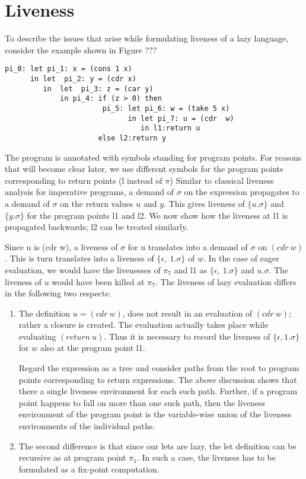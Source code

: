 \section{Liveness}\label{sec:liveness}
To describe the issues that arise while formulating liveness of a lazy
language, consider the example shown in Figure ???

\begin{verbatim}
pi_0: let pi_1: x = (cons 1 x)
      in let  pi_2: y = (cdr x)
         in  let  pi_3: z = (car y)
             in pi_4: if (z > 0) then 
                       pi_5: let pi_6: w = (take 5 x)
                             in let pi_7: u = (cdr  w)
                                in l1:return u
                      else l2:return y

\end{verbatim}

The program is annotated with symbols standing for program points. For
reasons that will  become clear later, we use  different symbols for
the program points corresponding to return points (l instead of $\pi$)
Similar  to classical  liveness  analysis for  imperative programs,  a
demand  of  $\sigma$ on  the  expression  propagates  to a  demand  of
$\sigma$  on the return  values $u$  and $y$.  This gives  liveness of
$\lbrace u.\sigma \rbrace$ and $\{y.\sigma\}$ for the program points l1 and l2. We now
show how the liveness at l1 is propagated backwards; l2 can be treated
similarly.

Since u is (cdr w), a liveness of $\sigma$ for u translates into a
demand of $\sigma$ on $(cdr~w)$. This is turn translates into a liveness
of $\{\epsilon,~1.\sigma\}$ of $w$. In the case of eager evaluation, we
would have the livenesses of $\pi_7$ and l1 as $\{\epsilon,~1.\sigma\}$ and
${u.\sigma}$. The liveness of $u$ would have been killed at $\pi_7$. The
liveness of lazy evaluation differs in the following two respects:
\begin{enumerate}
\item The definition  $u = (cdr~w)$, does not  result in an evaluation
  of $(cdr~w)$; rather a  closure is created.  The evaluation actually
  takes place  while evaluating $(return~u)$. Thus it  is necessary to
  record the liveness of $\{\epsilon,  1.\sigma\}$ for $w$ also at the
  program point l1.
  
  Regard the  expression as a  tree and consider  paths from
  the  root  to   program  points  corresponding  to  return
  expressions.   The  above discussion  shows  that there  a
  single liveness  environment for each  such path. Further,
  if a program  point happens to fall on  more than one such
  path, then  the liveness environment of  the program point
  is the variable-wise union of the liveness environments of
  the individual paths.
\item The second difference is that since our lets are lazy,
  the let  definition can be  recursive as at  program point
  $\pi_1$. In such a case, the liveness has to be formulated
  as a fix-point computation.
\end{enumerate}

